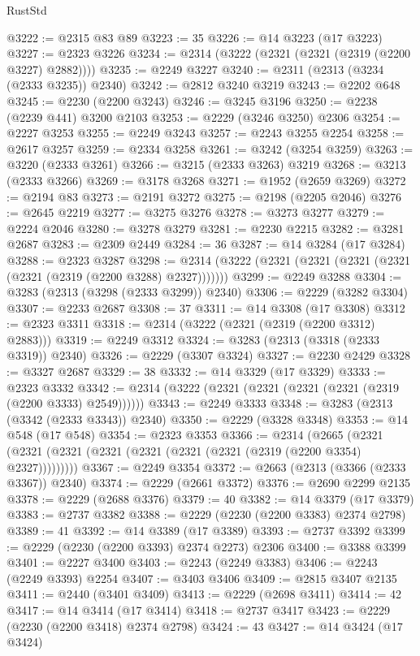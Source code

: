 \begin{lexlean}{RustStd}
\begin{coremodule}
@3222 := @2315 @83 @89
@3223 := 35
@3226 := @14 @3223 (@17 @3223)
@3227 := @2323 @3226
@3234 := @2314 (@3222 (@2321 (@2321 (@2319 (@2200 @3227) @2882))))
@3235 := @2249 @3227
@3240 := @2311 (@2313 (@3234 (@2333 @3235)) @2340)
@3242 := @2812 @3240 @3219
@3243 := @2202 @648
@3245 := @2230 (@2200 @3243)
@3246 := @3245 @3196
@3250 := @2238 (@2239 @441) @3200 @2103
@3253 := @2229 (@3246 @3250) @2306
@3254 := @2227 @3253
@3255 := @2249 @3243
@3257 := @2243 @3255 @2254
@3258 := @2617 @3257
@3259 := @2334 @3258
@3261 := @3242 (@3254 @3259)
@3263 := @3220 (@2333 @3261)
@3266 := @3215 (@2333 @3263) @3219
@3268 := @3213 (@2333 @3266)
@3269 := @3178 @3268
@3271 := @1952 (@2659 @3269)
@3272 := @2194 @83
@3273 := @2191 @3272
@3275 := @2198 (@2205 @2046)
@3276 := @2645 @2219
@3277 := @3275 @3276
@3278 := @3273 @3277
@3279 := @2224 @2046
@3280 := @3278 @3279
@3281 := @2230 @2215
@3282 := @3281 @2687
@3283 := @2309 @2449
@3284 := 36
@3287 := @14 @3284 (@17 @3284)
@3288 := @2323 @3287
@3298 := @2314 (@3222 (@2321 (@2321 (@2321 (@2321 (@2321 (@2319 (@2200 @3288) @2327)))))))
@3299 := @2249 @3288
@3304 := @3283 (@2313 (@3298 (@2333 @3299)) @2340)
@3306 := @2229 (@3282 @3304)
@3307 := @2233 @2687
@3308 := 37
@3311 := @14 @3308 (@17 @3308)
@3312 := @2323 @3311
@3318 := @2314 (@3222 (@2321 (@2319 (@2200 @3312) @2883)))
@3319 := @2249 @3312
@3324 := @3283 (@2313 (@3318 (@2333 @3319)) @2340)
@3326 := @2229 (@3307 @3324)
@3327 := @2230 @2429
@3328 := @3327 @2687
@3329 := 38
@3332 := @14 @3329 (@17 @3329)
@3333 := @2323 @3332
@3342 := @2314 (@3222 (@2321 (@2321 (@2321 (@2321 (@2319 (@2200 @3333) @2549))))))
@3343 := @2249 @3333
@3348 := @3283 (@2313 (@3342 (@2333 @3343)) @2340)
@3350 := @2229 (@3328 @3348)
@3353 := @14 @548 (@17 @548)
@3354 := @2323 @3353
@3366 := @2314
    (@2665 (@2321 (@2321 (@2321 (@2321 (@2321 (@2321 (@2321 (@2319 (@2200 @3354) @2327)))))))))
@3367 := @2249 @3354
@3372 := @2663 (@2313 (@3366 (@2333 @3367)) @2340)
@3374 := @2229 (@2661 @3372)
@3376 := @2690 @2299 @2135
@3378 := @2229 (@2688 @3376)
@3379 := 40
@3382 := @14 @3379 (@17 @3379)
@3383 := @2737 @3382
@3388 := @2229 (@2230 (@2200 @3383) @2374 @2798)
@3389 := 41
@3392 := @14 @3389 (@17 @3389)
@3393 := @2737 @3392
@3399 := @2229 (@2230 (@2200 @3393) @2374 @2273) @2306
@3400 := @3388 @3399
@3401 := @2227 @3400
@3403 := @2243 (@2249 @3383)
@3406 := @2243 (@2249 @3393) @2254
@3407 := @3403 @3406
@3409 := @2815 @3407 @2135
@3411 := @2440 (@3401 @3409)
@3413 := @2229 (@2698 @3411)
@3414 := 42
@3417 := @14 @3414 (@17 @3414)
@3418 := @2737 @3417
@3423 := @2229 (@2230 (@2200 @3418) @2374 @2798)
@3424 := 43
@3427 := @14 @3424 (@17 @3424)

\end{coremodule}
\end{lexlean}
